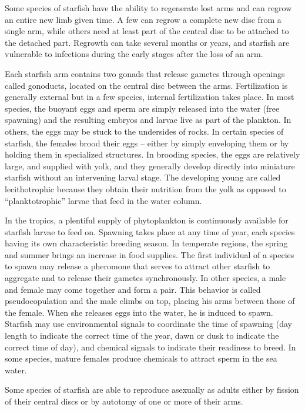 \documentclass[]{book}
\theoremstyle{definition}
\theoremstyle{definition}
\theoremstyle{definition}
\theoremstyle{remark}
\begin{document}
Some species of starfish have the ability to regenerate lost arms and
can regrow an entire new limb given time. A few can regrow a complete
new disc from a single arm, while others need at least part of the
central disc to be attached to the detached part. Regrowth can take
several months or years, and starfish are vulnerable to infections
during the early stages after the loss of an arm.

Each starfish arm contains two gonads that release gametes through
openings called gonoducts, located on the central disc between the arms.
Fertilization is generally external but in a few species, internal
fertilization takes place. In most species, the buoyant eggs and sperm
are simply released into the water (free spawning) and the resulting
embryos and larvae live as part of the plankton. In others, the eggs may
be stuck to the undersides of rocks. In certain species of starfish, the
females brood their eggs -- either by simply enveloping them or by
holding them in specialized structures. In brooding species, the eggs
are relatively large, and supplied with yolk, and they generally develop
directly into miniature starfish without an intervening larval stage.
The developing young are called lecithotrophic because they obtain their
nutrition from the yolk as opposed to ``planktotrophic'' larvae that
feed in the water column.

In the tropics, a plentiful supply of phytoplankton is continuously
available for starfish larvae to feed on. Spawning takes place at any
time of year, each species having its own characteristic breeding
season. In temperate regions, the spring and summer brings an increase
in food supplies. The first individual of a species to spawn may release
a pheromone that serves to attract other starfish to aggregate and to
release their gametes synchronously. In other species, a male and female
may come together and form a pair. This behavior is called
pseudocopulation and the male climbs on top, placing his arms between
those of the female. When she releases eggs into the water, he is
induced to spawn. Starfish may use environmental signals to coordinate
the time of spawning (day length to indicate the correct time of the
year, dawn or dusk to indicate the correct time of day), and chemical
signals to indicate their readiness to breed. In some species, mature
females produce chemicals to attract sperm in the sea water.

Some species of starfish are able to reproduce asexually as adults
either by fission of their central discs or by autotomy of one or more
of their arms.
\end{document}

